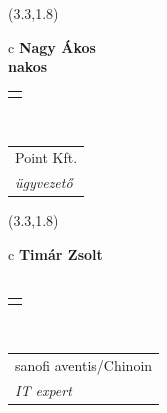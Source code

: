 \documentclass[11pt]{article}
\begin{document}
\makebox(3.3,1.8){
  \renewcommand\arraystretch{1.3}
  \begin{tabular}[c]{c}
    \hspace{8.5mm}
    \LARGE\bf{ Nagy Ákos }\\
    \hspace{8.5mm}
    \Large{ nakos }\\
    \renewcommand\arraystretch{3}
    \begin{tabular}[c]{c}
      \centering
      \fontfamily{phv}\selectfont{
        \textbf{
          \textsc{
            \scriptsize{
            \color{Dark}{ Ismerkedő }\color{Bright}{ Webmester }\color{Bright}{ Sminkmester }\color{Bright}{ Programozó }
            }
          }
        }
      }
    \end{tabular}
    \\
    \renewcommand\arraystretch{1}
    \begin{tabular}{p{3.3in}}
      \hspace{.7cm}Point Kft.\\
      \hspace{.7cm}\emph{ ügyvezető }\\
    \end{tabular}
  \end{tabular}
}

\makebox(3.3,1.8){
  \renewcommand\arraystretch{1.3}
  \begin{tabular}[c]{c}
    \hspace{8.5mm}
    \LARGE\bf{ Timár Zsolt }\\
    \hspace{8.5mm}
    \Large{  }\\
    \renewcommand\arraystretch{3}
    \begin{tabular}[c]{c}
      \centering
      \fontfamily{phv}\selectfont{
        \textbf{
          \textsc{
            \scriptsize{
            \color{Bright}{ Ismerkedő }\color{Dark}{ Webmester }\color{Bright}{ Sminkmester }\color{Bright}{ Programozó }
            }
          }
        }
      }
    \end{tabular}
    \\
    \renewcommand\arraystretch{1}
    \begin{tabular}{p{3.3in}}
      \hspace{.7cm}sanofi aventis/Chinoin\\
      \hspace{.7cm}\emph{ IT expert }\\
    \end{tabular}
  \end{tabular}
}
\end{document}
